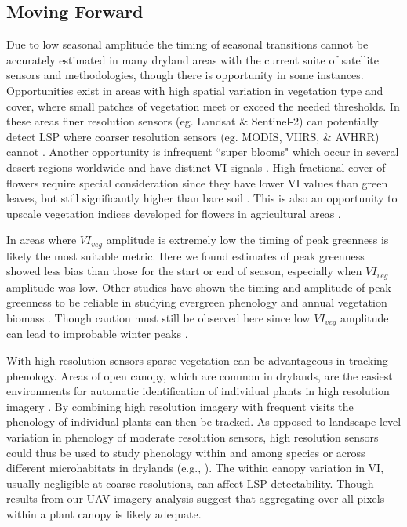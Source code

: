 \documentclass{article}
\begin{document}
\subsection{Moving Forward}
Due to low seasonal amplitude the timing of seasonal transitions cannot be accurately estimated in many dryland areas with the current suite of satellite sensors and methodologies, though there is opportunity in some instances. Opportunities exist in areas with high spatial variation in vegetation type and cover, where small patches of vegetation meet or exceed the needed thresholds. In these areas finer resolution sensors (eg. Landsat \& Sentinel-2) can potentially detect LSP where coarser resolution sensors (eg. MODIS, VIIRS, \& AVHRR) cannot \cite{peng2021}. Another opportunity is infrequent “super blooms" which occur in several desert regions worldwide and have distinct VI signals \cite{chavez2019}. High fractional cover of flowers require special consideration since they have lower VI values than green leaves, but still significantly higher than bare soil \cite{shen-chen2009}. This is also an opportunity to upscale vegetation indices developed for flowers in agricultural areas \cite{dixon2021, chen-jin2019}.

In areas where $VI_{veg}$ amplitude is extremely low the timing of peak greenness is likely the most suitable metric. Here we found estimates of peak greenness showed less bias than those for the start or end of season, especially when $VI_{veg}$ amplitude was low. Other studies have shown the timing and amplitude of peak greenness to be reliable in studying evergreen phenology \cite{walker2014, walker2015} and annual vegetation biomass \cite{casady2013}. Though caution must still be observed here since low $VI_{veg}$ amplitude can lead to improbable winter peaks \cite{norris2020}.

With high-resolution sensors sparse vegetation can be advantageous in tracking phenology. Areas of open canopy, which are common in drylands, are the easiest environments for automatic identification of individual plants in high resolution imagery \cite{weinstein2020}. By combining high resolution imagery with frequent visits the phenology of individual plants can then be tracked. As opposed to landscape level variation in phenology of moderate resolution sensors, high resolution sensors could thus be used to study phenology within and among species or across different microhabitats in drylands (e.g., \cite{browning2017b}). The within canopy variation in VI, usually negligible at coarse resolutions, can affect LSP detectability. Though results from our UAV imagery analysis suggest that aggregating over all pixels within a plant canopy is likely adequate. 
\end{document}
